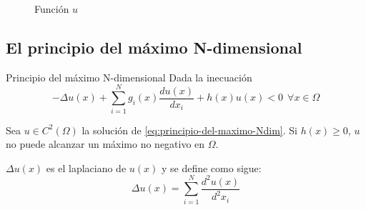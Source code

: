 \begin{figure}[ht]
\centering
\begin{subfigure}{.5\textwidth}
	\centering
	\caption{}
	\label{fig:sol-contraejemplo-pm1}
\end{subfigure}%
\begin{subfigure}{.5\textwidth}
	\centering
	\caption{}
	\label{fig:sol-contraejemplo-pm2}
\end{subfigure}%

\caption{Función $u$}
\label{fig:sol-contraejemplo-pm}
\end{figure}

\newpage
\subsection{El principio del máximo N-dimensional}
\begin{mathresult}{Principio del máximo N-dimensional}
Dada la inecuación
\begin{equation}\label{eq:principio-del-maximo-Ndim}
-\Delta u(x) + \sum_{i=1}^N g_i(x)\frac{du(x)}{dx_i}+h(x)u(x) < 0 \ \ \forall x\in\Omega
\end{equation}

Sea $u\in C^2(\Omega)$ la solución de \eqref{eq:principio-del-maximo-Ndim}.
Si $h(x) \ge 0$, $u$ no puede alcanzar un máximo no negativo en $\Omega$.
\end{mathresult}
\see $\Delta u(x)$ es el laplaciano de $u(x)$ y se define como sigue:
$$\Delta u(x) = \sum_{i=1}^N\frac{d^2u(x)}{d^2x_i}$$

